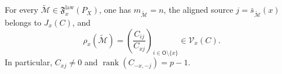 For every \(\widetilde{\mathcal M}\in\mathfrak F_x^{\mathrm{law}}(P_X)\), one has \(m_{\widetilde{\mathcal M}}=n\), the aligned source \(j=\bar s_{\widetilde{\mathcal M}}(x)\) belongs to \(J_x(C)\), and
\[
 \rho_x(\widetilde{\mathcal M})
 =\left(\frac{C_{ij}}{C_{xj}}\right)_{i\in\mathsf O\setminus\{x\}}
 \in\mathcal V_x(C).
\]
In particular, \(C_{xj}\ne0\) and \(\operatorname{rank}(C_{-x,-j})=p-1\).